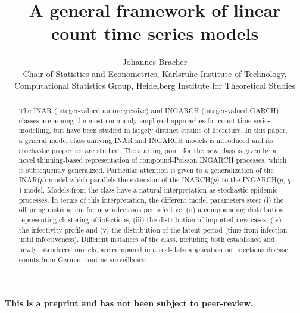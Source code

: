 \documentclass{article}
\begin{document}
\title{A general framework of linear count time series models}
\author{Johannes Bracher\\
Chair of Statistics and Econometrics, Karlsruhe Institute of Technology, \\ %
Computational Statistics Group, Heidelberg Institute for Theoretical Studies}


\newcommand{\juv}{E}

\maketitle


\begin{abstract}
The INAR (integer-valued autoregressive) and INGARCH (integer-valued GARCH) classes are among the most commonly employed approaches for count time series modelling, but have been studied in largely distinct strains of literature. In this paper, a general model class unifying INAR and INGARCH models is introduced and its stochastic properties are studied. The starting point for the new class is given by a novel thinning-based representation of compound-Poisson INGARCH processes, which is subsequently generalized. Particular attention is given to a generalization of the INAR($p$) model which parallels the extension of the INARCH($p$) to the INGARCH($p$, $q$) model. Models from the class have a natural interpretation as stochastic epidemic processes. In terms of this interpretation, the different model parameters steer (i) the offspring distribution for new infections per infective, (ii) a compounding distribution representing clustering of infections, (iii) the distribution of imported new cases, (iv) the infectivity profile and (v) the distribution of the latent period (time from infection until infectiveness). Different instances of the class, including both established and newly introduced models, are compared in a real-data application on infectious disease counts from German routine surveillance. 
\end{abstract}

\bigskip

\begin{center}
\textbf{This is a preprint and has not been subject to peer-review.}
\end{center}
\end{document}
